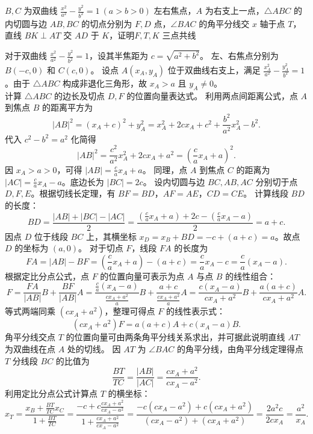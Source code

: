 \begin{exercise}
 $B,C$ 为双曲线 $\frac{x^2}{a^2} - \frac{y^2}{b^2} = 1\ (a > b > 0)$ 左右焦点，$A$ 为右支上一点，$\triangle ABC$ 的内切圆与边 $AB,BC$ 的切点分别为 $F,D$ 点，$\angle BAC$ 的角平分线交 $x$ 轴于点 $T$，直线 $BK \perp AT$ 交 $AD$ 于 $K$，证明$F,T,K$ 三点共线
\end{exercise}
\begin{solution}
对于双曲线 $\frac{x^2}{a^2} - \frac{y^2}{b^2} = 1$，设其半焦距为 $c = \sqrt{a^2+b^2}$。
左、右焦点分别为 $B(-c, 0)$ 和 $C(c, 0)$。
设点 $A(x_A, y_A)$ 位于双曲线右支上，满足 $\frac{x_A^2}{a^2} - \frac{y_A^2}{b^2} = 1$。由于 $\triangle ABC$ 构成非退化三角形，故 $x_A > a$ 且 $y_A \neq 0$。\\
计算 $\triangle ABC$ 的边长及切点 $D, F$ 的位置向量表达式。
利用两点间距离公式，点 $A$ 到焦点 $B$ 的距离平方为
\[ |AB|^2 = (x_A + c)^2 + y_A^2 = x_A^2 + 2cx_A + c^2 + \frac{b^2}{a^2}x_A^2 - b^2. \]
代入 $c^2 - b^2 = a^2$ 化简得
\[ |AB|^2 = \frac{c^2}{a^2}x_A^2 + 2cx_A + a^2 = \left( \frac{c}{a}x_A + a \right)^2. \]
因 $x_A > a > 0$，可得 $|AB| = \frac{c}{a}x_A + a$。
同理，点 $A$ 到焦点 $C$ 的距离为 $|AC| = \frac{c}{a}x_A - a$。底边长为 $|BC| = 2c$。
设内切圆与边 $BC, AB, AC$ 分别切于点 $D, F, E$。根据切线长定理，有 $BF = BD$，$AF = AE$，$CD = CE$。
计算线段 $BD$ 的长度：
\[ BD = \frac{|AB| + |BC| - |AC|}{2} = \frac{\left(\frac{c}{a}x_A + a\right) + 2c - \left(\frac{c}{a}x_A - a\right)}{2} = a + c. \]
因点 $D$ 位于线段 $BC$ 上，其横坐标 $x_D = x_B + BD = -c + (a + c) = a$。故点 $D$ 的坐标为 $(a, 0)$。
对于切点 $F$，线段 $FA$ 的长度为
\[ FA = |AB| - BF = \left(\frac{c}{a}x_A + a\right) - (a + c) = \frac{c}{a}x_A - c = \frac{c}{a}(x_A - a). \]
根据定比分点公式，点 $F$ 的位置向量可表示为点 $A$ 与点 $B$ 的线性组合：
\[ F = \frac{FA}{|AB|} B + \frac{BF}{|AB|} A = \frac{\frac{c}{a}(x_A - a)}{\frac{cx_A + a^2}{a}} B + \frac{a + c}{\frac{cx_A + a^2}{a}} A = \frac{c(x_A - a)}{cx_A + a^2} B + \frac{a(a + c)}{cx_A + a^2} A. \]
等式两端同乘 $(cx_A + a^2)$，整理可得点 $F$ 的线性表示式：
\[ (cx_A + a^2) F = a(a + c) A + c(x_A - a) B. \]
角平分线交点 $T$ 的位置向量可由两条角平分线关系求出，并可据此说明直线 $AT$ 为双曲线在点 $A$ 处的切线。
因 $AT$ 为 $\angle BAC$ 的角平分线，由角平分线定理得点 $T$ 分线段 $BC$ 的比值为
\[ \frac{BT}{TC} = \frac{|AB|}{|AC|} = \frac{cx_A + a^2}{cx_A - a^2}. \]
利用定比分点公式计算点 $T$ 的横坐标：
\[ x_T = \frac{x_B + \frac{BT}{TC} x_C}{1 + \frac{BT}{TC}} = \frac{-c + c \frac{cx_A + a^2}{cx_A - a^2}}{1 + \frac{cx_A + a^2}{cx_A - a^2}} = \frac{-c(cx_A - a^2) + c(cx_A + a^2)}{(cx_A - a^2) + (cx_A + a^2)} = \frac{2a^2 c}{2cx_A} = \frac{a^2}{x_A}. \]

\end{solution}
